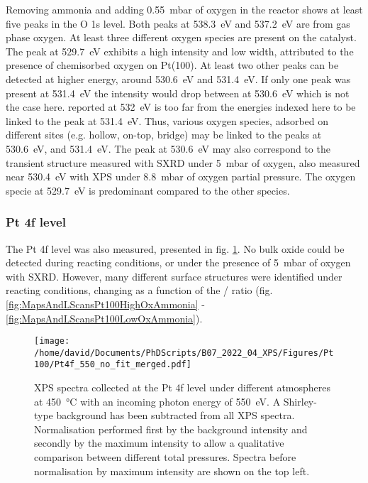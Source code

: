 Removing ammonia and adding \qty{0.55}{\milli\bar} of oxygen in the reactor shows at least five peaks in the O 1s level.
Both peaks at \qty{538.3}{\eV} and \qty{537.2}{\eV} are from gas phase oxygen.
At least three different oxygen species are present on the catalyst.
The peak at \qty{529.7}{\eV} exhibits a high intensity and low width, attributed to the presence of chemisorbed oxygen on Pt(100).
At least two other peaks can be detected at higher energy, around \qty{530.6}{\eV} and \qty{531.4}{\eV}.
If only one peak was present at \qty{531.4}{\eV} the intensity would drop between at \qty{530.6}{\eV} which is not the case here.
 reported at \qty{532}{\eV} \parencite{Kondratenko2006} is too far from the energies indexed here to be linked to the peak at \qty{531.4}{\eV}.
Thus, various oxygen species, adsorbed on different sites (e.g. hollow, on-top, bridge) may be linked to the peaks at \qty{530.6}{\eV}, and \qty{531.4}{\eV}.
The peak at \qty{530.6}{\eV} may also correspond to the transient structure measured with SXRD under \qty{5}{\milli\bar} of oxygen, also measured near \qty{530.4}{\eV} with XPS under \qty{8.8}{\milli\bar} of oxygen partial pressure.
The oxygen specie at \qty{529.7}{\eV} is predominant compared to the other species.

\subsubsection{Pt 4f level}

The Pt 4f level was also measured, presented in fig. \ref{fig:Pt4fPt100}.
No bulk oxide could be detected during reacting conditions, or under the presence of \qty{5}{\milli\bar} of oxygen with SXRD.
However, many different surface structures were identified under reacting conditions, changing as a function of the / ratio (fig. \ref{fig:MapsAndLScansPt100HighOxAmmonia} - \ref{fig:MapsAndLScansPt100LowOxAmmonia}).

\begin{figure}[!htb]
    \centering
    \texttt{[image: /home/david/Documents/PhDScripts/B07\_2022\_04\_XPS/Figures/Pt100/Pt4f\_550\_no\_fit\_merged.pdf]}
    \caption{
        XPS spectra collected at the Pt 4f level under different atmospheres at \qty{450}{\degreeCelsius} with an incoming photon energy of \qty{550}{\eV}.
        A Shirley-type background has been subtracted from all XPS spectra.
        Normalisation performed first by the background intensity and secondly by the maximum intensity to allow a qualitative comparison between different total pressures.
        Spectra before normalisation by maximum intensity are shown on the top left.
    }
    \label{fig:Pt4fPt100}
\end{figure}

